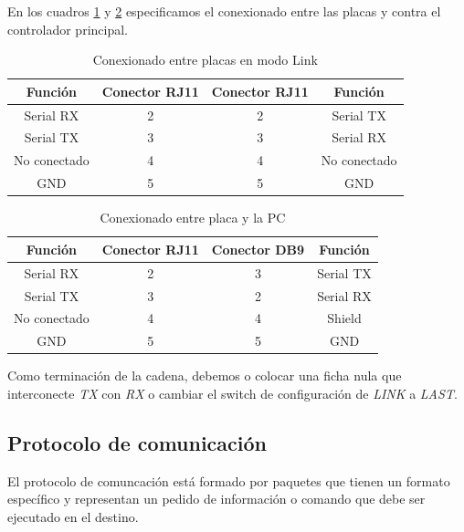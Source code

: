 En los cuadros \ref{hT_comm_conexionLink} y \ref{hT_comm_conexionRS232} especificamos el conexionado entre las placas
y contra el controlador principal.

\begin{table}[ht]
	\begin{center}
		\begin{tabular}{|c|c|c|c|}
			\hline
			Funci\'on & Conector RJ11 & Conector RJ11 & Funci\'on\\
			\hline
			Serial RX & 2 & 2 & Serial TX \\
			\hline
			Serial TX & 3 & 3 & Serial RX \\
			\hline
			No conectado & 4 & 4 & No conectado \\
			\hline
			GND & 5 & 5 &  GND\\
			\hline
		\end{tabular}
		\caption{Conexionado entre placas en modo Link}
		\label{hT_comm_conexionLink}
	\end{center}
\end{table}

\begin{table}[ht]
	\begin{center}
		\begin{tabular}{|c|c|c|c|}
			\hline
			Funci\'on & Conector RJ11 & Conector DB9 & Funci\'on\\
			\hline
			Serial RX & 2 & 3 & Serial TX \\
			\hline
			Serial TX & 3 & 2 & Serial RX \\
			\hline
			No conectado & 4 & 4 & Shield \\
			\hline
			GND & 5 & 5 &  GND\\
			\hline
		\end{tabular}
		\caption{Conexionado entre placa y la PC}
		\label{hT_comm_conexionRS232}
	\end{center}
\end{table}

Como terminaci\'on de la cadena, debemos o colocar una ficha nula que interconecte \emph{TX} con \emph{RX} o
cambiar el switch de configuraci\'on de \emph{LINK} a \emph{LAST}.

\subsection{Protocolo de comunicaci\'on}
\label{h_comm_protocolo}

El protocolo de comuncaci\'on est\'a formado por paquetes que tienen un formato espec\'ifico y representan un pedido de
informaci\'on o comando que debe ser ejecutado en el destino.

